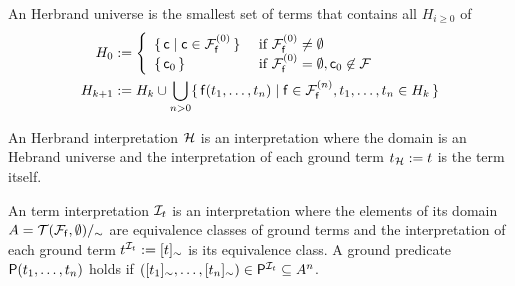 \begin{definition}\label{def:hk}
	An {\myem Herbrand universe} is the smallest set of terms that contains all $H_{i\geq 0}$ of
	\begin{align*}
	H_0 &:= \left\{ 
	\begin{array}{ll}
	\{\,\mc \mid \mc\in\mcFfn[0]\,\} 
	&\text{if } \mcFfn[0]\not=\emptyset\\
	\{\,\mc_0\,\}
	&\text{if } \mcFfn[0]=\emptyset, \mc_0\not\in\mcF
	\end{array}
	\right. 
	\\
	H_{k+1} &:= H_k \cup \bigcup_{n> 0} 
	\{\,  
	\mf(t_1,\ldots,t_n) \mid
	\mf\in\mcFfn[n],
	t_1,\ldots,t_n \in H_k
	\,\}
	\end{align*}
	
\end{definition}

\begin{definition}
	An {\myem Herbrand interpretation} ${\mathcal H}$ is an interpretation where the domain 
	is an Hebrand universe
	and the interpretation of each ground term $t_{\mathcal H} := t$ is the term itself.
\end{definition}


\begin{definition}
	An {\myem term interpretation} 
	${\mathcal I}_t$ 
	is an interpretation 
	where the elements of its domain $A = {{\mathcal T}({\mathcal F}_{\mathsf f},\emptyset)}/_\sim$ 
		are equivalence classes of ground terms
		and the interpretation of each ground term $t^{{\mathcal I}_t} := [t]_\sim$ is its equivalence class.
	 A ground predicate ${\mathsf P}(t_1,\ldots,t_n)$ holds if 
	 $([t_1]_\sim,\ldots,[t_n]_\sim) \in {\mathsf P}^{{\mathcal I}_t} \subseteq A^n$.
	
\end{definition}

